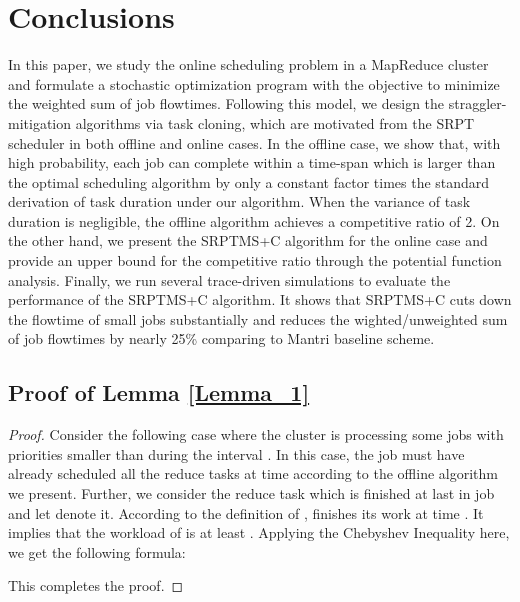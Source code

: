 \documentclass[10pt,conference,compsocconf,letterpaper]{IEEEtran}
\begin{document}
\section{Conclusions}
\label{conclusion}
In this paper, we study the online scheduling problem in a  MapReduce cluster and formulate a stochastic optimization program with the objective to minimize the
weighted sum of job flowtimes. Following this model, we design the straggler-mitigation algorithms via task cloning,  which are motivated from the SRPT scheduler  in
both offline and online cases. In the offline case, we show that, with high probability, each job can complete within a time-span which is 
larger than the optimal scheduling algorithm by only a constant factor times the standard derivation of task duration under our algorithm. 
When the variance of task duration is negligible, the offline algorithm achieves a competitive ratio of 2. On the other hand,
we present the SRPTMS+C algorithm for the online case and provide an upper bound for the competitive ratio through the potential function analysis. Finally, we run several trace-driven simulations to evaluate the performance of the SRPTMS+C algorithm. It shows that SRPTMS+C cuts down the flowtime of small jobs substantially
 and reduces the wighted/unweighted sum of job flowtimes by nearly 25\% comparing to Mantri baseline scheme.







\appendix
\subsection{Proof of Lemma \ref{Lemma_1}}
\label{proof_lemma_1}
\begin{proof}
Consider the following case where the cluster is processing some jobs with priorities smaller than  during the interval . In this case, the job  must have already scheduled all the reduce tasks at time  according to the offline algorithm we present. Further, we consider the reduce task which is finished at last in job  and let  denote it. According to the definition of ,  finishes its work at time . It implies that  the workload of  is at least . Applying the Chebyshev Inequality \cite{probability} here, we get the following formula:

This completes the proof.
\end{proof}
\end{document}
